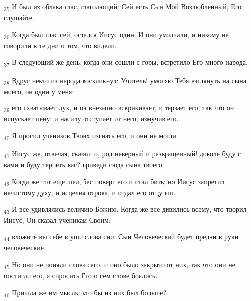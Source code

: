 \begin{tcolorbox}
\textsubscript{35} И был из облака глас, глаголющий: Сей есть Сын Мой Возлюбленный, Его слушайте.
\end{tcolorbox}
\begin{tcolorbox}
\textsubscript{36} Когда был глас сей, остался Иисус один. И они умолчали, и никому не говорили в те дни о том, что видели.
\end{tcolorbox}
\begin{tcolorbox}
\textsubscript{37} В следующий же день, когда они сошли с горы, встретило Его много народа.
\end{tcolorbox}
\begin{tcolorbox}
\textsubscript{38} Вдруг некто из народа воскликнул: Учитель! умоляю Тебя взглянуть на сына моего, он один у меня:
\end{tcolorbox}
\begin{tcolorbox}
\textsubscript{39} его схватывает дух, и он внезапно вскрикивает, и терзает его, так что он испускает пену; и насилу отступает от него, измучив его.
\end{tcolorbox}
\begin{tcolorbox}
\textsubscript{40} Я просил учеников Твоих изгнать его, и они не могли.
\end{tcolorbox}
\begin{tcolorbox}
\textsubscript{41} Иисус же, отвечая, сказал: о, род неверный и развращенный! доколе буду с вами и буду терпеть вас? приведи сюда сына твоего.
\end{tcolorbox}
\begin{tcolorbox}
\textsubscript{42} Когда же тот еще шел, бес поверг его и стал бить; но Иисус запретил нечистому духу, и исцелил отрока, и отдал его отцу его.
\end{tcolorbox}
\begin{tcolorbox}
\textsubscript{43} И все удивлялись величию Божию. Когда же все дивились всему, что творил Иисус, Он сказал ученикам Своим:
\end{tcolorbox}
\begin{tcolorbox}
\textsubscript{44} вложите вы себе в уши слова сии: Сын Человеческий будет предан в руки человеческие.
\end{tcolorbox}
\begin{tcolorbox}
\textsubscript{45} Но они не поняли слова сего, и оно было закрыто от них, так что они не постигли его, а спросить Его о сем слове боялись.
\end{tcolorbox}
\begin{tcolorbox}
\textsubscript{46} Пришла же им мысль: кто бы из них был больше?
\end{tcolorbox}
